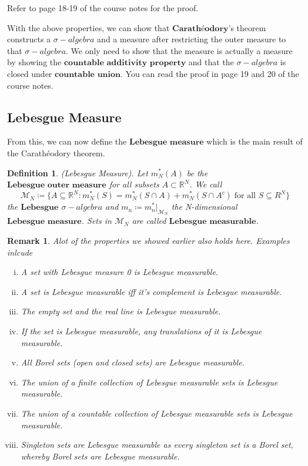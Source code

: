 \documentclass[twoside]{article}
\newtheorem{remark}[theorem]{Remark}
\newtheorem{definition}[theorem]{Definition}
\newcommand{\sa}{\sigma-algebra}
\begin{document}
Refer to page 18-19 of the course notes for the proof.

With the above properties, we can show that $\textbf{Carathéodory}$'s theorem constructs a $\sa$ and a measure after restricting the outer measure to that $\sa$. We only need to show that the measure is actually a measure by showing the $\textbf{countable additivity property}$ and that the $\sa$ is closed under $\textbf{countable union}$. You can read the proof in page 19 and 20 of the course notes.

\subsection{Lebesgue Measure}
From this, we can now define the $\textbf{Lebesgue measure}$ which is the main result of the Carathéodory theorem.
\begin{definition}
(Lebesgue Measure). Let $m^*_N(A)$ be the $\textbf{Lebesgue outer measure}$ for all subsets $A \subset \mathbb{R}^N$. We call
$$
\mathcal{M}_N \coloneqq \{A \subseteq \mathbb{R}^N: m^*_N(S) = m^*_N(S \cap A) + m^*_N(S \cap A^c) \; \text{for all } S \subseteq R^N\}
$$
the $\textbf{Lebesgue}$ $\sa$ and $m_n \coloneqq m^*_n|_{\mathcal{M}_N}$ the N-dimensional $\textbf{Lebesgue measure}$. Sets in $\mathcal{M}_N$ are called $\textbf{Lebesgue measurable}$.
\end{definition}


\begin{remark}
Alot of the properties we showed earlier also holds here. Examples inlcude 
\begin{enumerate}[(i)]
  \item A set with Lebesgue measure 0 is Lebesgue measurable.
  \item A set is Lebesgue measurable iff it's complement is Lebesgue measurable.
  \item The empty set and the real line is Lebesgue measurable.
  \item If the set is Lebesgue measurable, any translations of it is Lebesgue measurable.
  \item All Borel sets (open and closed sets) are Lebesgue measurable.
  \item The union of a finite collection of Lebesgue measurable sets is Lebesgue measurable.
  \item The union of a countable collection of Lebesgue measurable sets is Lebesgue measurable.
  \item Singleton sets are Lebesgue measurable as every singleton set is a Borel set, whereby Borel sets are Lebesgue measurable.

\end{enumerate}
\end{remark}
\end{document}
